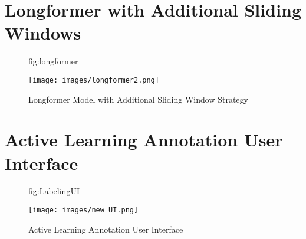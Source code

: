 \documentclass[pmlr,twocolumn]{jmlr} %
\begin{document}
\section{Longformer with Additional Sliding Windows}\label{apd:app4}

\begin{figure}[htbp]
\floatconts
  {fig:longformer}
  {\caption{Longformer Model with Additional Sliding Window Strategy}}
  {\texttt{[image: images/longformer2.png]}}
\end{figure}
\clearpage


\section{Active Learning Annotation User Interface}\label{apd:app5}


\begin{figure}[htbp]
\floatconts
  {fig:LabelingUI}
  {\caption{Active Learning Annotation User Interface}}
  {\texttt{[image: images/new\_UI.png]}}
\end{figure}
\end{document}
